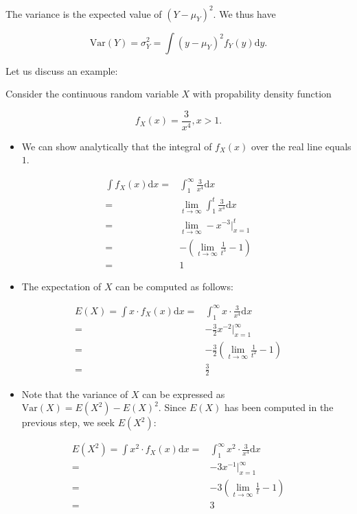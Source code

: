 \documentclass[]{book}
\providecommand{\tightlist}{%
  \setlength{\itemsep}{0pt}\setlength{\parskip}{0pt}}
\theoremstyle{definition}
\theoremstyle{definition}
\theoremstyle{definition}
\theoremstyle{remark}
\begin{document}
The variance is the expected value of \((Y - \mu_Y)^2\). We thus have

\[ \text{Var}(Y) =  \sigma_Y^2 = \int (y - \mu_Y)^2 f_Y(y) \mathrm{d}y. \]

Let us discuss an example:

Consider the continuous random variable \(X\) with propability density
function

\[ f_X(x) = \frac{3}{x^4}, x>1. \]

\begin{itemize}
\tightlist
\item
  We can show analytically that the integral of \(f_X(x)\) over the real
  line equals \(1\).
\end{itemize}

\begin{align}
 \int f_X(x) \mathrm{d}x =&  \int_{1}^{\infty} \frac{3}{x^4} \mathrm{d}x \\
  =& \lim_{t \rightarrow \infty} \int_{1}^{t} \frac{3}{x^4} \mathrm{d}x \\
  =& \lim_{t \rightarrow \infty}  -x^{-3} \rvert_{x=1}^t \\
  =& -\left(\lim_{t \rightarrow \infty}\frac{1}{t^3} - 1\right) \\
  =& 1
\end{align}

\begin{itemize}
\tightlist
\item
  The expectation of \(X\) can be computed as follows:
\end{itemize}

\begin{align}
 E(X) = \int x \cdot f_X(x) \mathrm{d}x =&  \int_{1}^{\infty} x \cdot \frac{3}{x^4} \mathrm{d}x \\
  =& - \frac{3}{2} x^{-2} \rvert_{x=1}^{\infty} \\
  =& -\frac{3}{2} \left( \lim_{t \rightarrow \infty} \frac{1}{t^2} - 1 \right) \\
  =& \frac{3}{2}
\end{align}

\begin{itemize}
\tightlist
\item
  Note that the variance of \(X\) can be expressed as
  \(\text{Var}(X) = E(X^2) - E(X)^2\). Since \(E(X)\) has been computed
  in the previous step, we seek \(E(X^2)\):
\end{itemize}

\begin{align}
 E(X^2)= \int x^2 \cdot f_X(x) \mathrm{d}x =&  \int_{1}^{\infty} x^2 \cdot \frac{3}{x^4} \mathrm{d}x \\
  =& -3 x^{-1} \rvert_{x=1}^{\infty} \\
  =& -3 \left( \lim_{t \rightarrow \infty} \frac{1}{t} - 1 \right) \\
  =& 3
\end{align}
\end{document}
